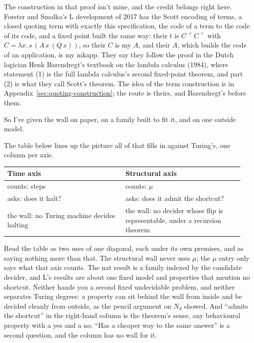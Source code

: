 \documentclass[11pt,twoside]{article}
\theoremstyle{thielethm}
\theoremstyle{thieledef}
\theoremstyle{thieledef}
\theoremstyle{thieledef}
\theoremstyle{thielethm}
\theoremstyle{thieleobs}
\theoremstyle{thielethm}
\begin{document}
The construction in that proof isn't mine, and the credit belongs right here. Forster and Smolka's
L development of 2017 has the Scott encoding of terms, a closed quoting term with exactly this
specification, the code of a term to the code of its code, and a fixed point built the same way:
their $t$ is $C\,\ulcorner C \urcorner$ with $C = \lambda x.\, s\,(A\,x\,(Q\,x))$, so their $C$ is
my $A$, and their $A$, which builds the code of an application, is my $\mathrm{mkapp}$. They say they
follow the proof in the Dutch logician Henk Barendregt's textbook on the lambda calculus (1984),
where statement (1) is the full lambda calculus's second fixed-point theorem, and part (2) is what
they call Scott's theorem. The idea of the term construction is in Appendix~\ref{sec:quoting-construction};
the route is theirs, and Barendregt's before them.

So I've given the wall on paper, on a family built to fit it, and on one outside model.

The table below lines up the picture all of that fills in against Turing's, one column per axis.

\begingroup\small
\begin{longtable}{@{}>{\raggedright\arraybackslash}p{0.482\linewidth}>{\raggedright\arraybackslash}p{0.482\linewidth}@{}}
\toprule
\textbf{Time axis} & \textbf{Structural axis} \\
\midrule
\endhead
\bottomrule
\endlastfoot
counts: steps & counts: $\mu$ \\
asks: does it halt? & asks: does it admit the shortcut? \\
the wall: no Turing machine decides halting & the wall: no decider whose flip is representable, under a recursion theorem \\
\end{longtable}
\endgroup

Read the table as two uses of one diagonal, each under its own premises, and as saying nothing more than that.
The structural wall never uses $\mu$; the $\mu$ entry only says what that axis counts. The
nat result is a family indexed by the candidate decider, and L's results are about one fixed
model and properties that mention no shortcut. Neither hands you a second fixed undecidable
problem, and neither separates Turing degrees: a property can sit behind the wall from inside
and be decided cleanly from outside, as the pencil argument on $N_d$ showed. And ``admits the
shortcut'' in the right-hand column is the theorem's sense, any behavioural property with a yes and
a no. ``Has a cheaper way to the same answer'' is a second question, and the column has no wall for it.
\end{document}
